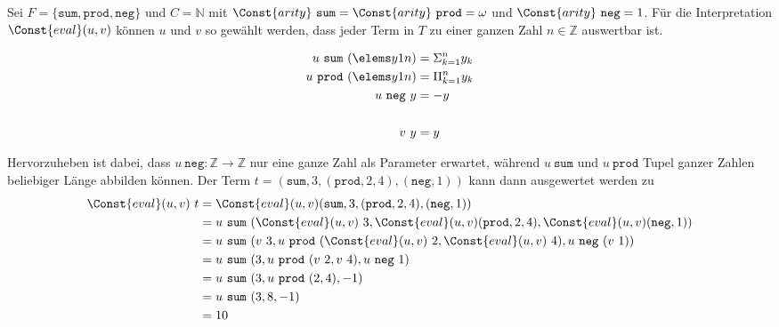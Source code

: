 \begin{beispiel} \label{bEval}
Sei $F = \{\texttt{sum}, \texttt{prod}, \texttt{neg} \}$ und $C = \mathbb{N}$ mit $\Const{arity}~ \texttt{sum} = \Const{arity}~ \texttt{prod} = \omega$ und $\Const{arity}~ \texttt{neg} = 1$.
Für die Interpretation $\Const{eval}(u, v)$ können $u$ und $v$ so gewählt werden, dass jeder Term in $T$ zu einer ganzen Zahl $n \in \mathbb{Z}$ auswertbar ist.

\begin{equation*}
    \begin{split}
    u~\texttt{sum}  ~(\elems y 1 n) &= \Sigma_{k = 1}^n y_k\\
    u~\texttt{prod} ~(\elems y 1 n) &=    \Pi_{k = 1}^n y_k\\
    u~\texttt{neg}~y &= -y\\
    &\\
    v~y &= y
    \end{split}
\end{equation*}

Hervorzuheben ist dabei, dass $u~\texttt{neg} \colon \mathbb Z \rightarrow \mathbb Z$ nur eine ganze Zahl als Parameter erwartet, während $u~\texttt{sum}$ und $u~\texttt{prod}$ Tupel ganzer Zahlen beliebiger Länge abbilden können.
Der Term $t = (\texttt{sum}, 3, (\texttt{prod}, 2, 4), (\texttt{neg}, 1))$ kann dann ausgewertet werden zu 
\begin{equation*}
    \begin{split}
    \Const{eval}(u, v)~t &= \Const{eval}(u, v) (\texttt{sum}, 3, (\texttt{prod}, 2, 4), (\texttt{neg}, 1)) \\
    &= u~\texttt{sum}~(\Const{eval}(u, v)~3, \Const{eval}(u, v)(\texttt{prod}, 2, 4),  \Const{eval}(u, v) (\texttt{neg}, 1)) \\
    &= u~\texttt{sum}~(v~3, u~\texttt{prod}~(\Const{eval}(u, v)~2, \Const{eval}(u, v)~4), u~\texttt{neg}~ (v~1)) \\
    &= u~\texttt{sum}~(3, u~\texttt{prod}~(v~2, v~4), u~\texttt{neg}~ 1) \\
    &= u~\texttt{sum}~(3, u~\texttt{prod}~(2, 4), -1) \\
    &= u~\texttt{sum}~( 3, 8, -1) \\
    &= 10 \\
    \end{split}
\end{equation*}
\end{beispiel}


